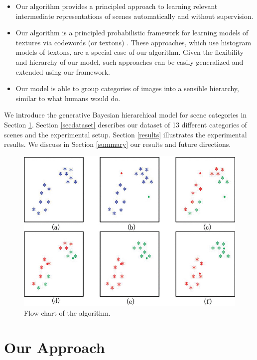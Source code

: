 \documentclass[10pt,a4paper,twocolumn]{article}
\begin{document}
\begin{itemize}
\item Our algorithm provides a principled approach to learning relevant intermediate representations of scenes automatically and without supervision.

\item  Our algorithm is a principled probabilistic framework for learning models of textures via codewords (or textons) \cite{malik, portilla, varma}. These approaches, which use histogram models of textons, are a special case of our algorithm. Given the flexibility and hierarchy of our model, such approaches can be easily generalized and extended using our framework.

\item  Our model is able to group categories of images into a sensible hierarchy, similar to what humans would do.
\end{itemize}

We introduce the generative Bayesian hierarchical model for scene categories in Section \ref{approach}. Section \ref{secdataset} describes our dataset of 13 different categories of scenes and the experimental setup. Section \ref{results} illustrates the experimental results. We discuss in Section \ref{summary} our results and future directions.\\

\begin{figure}
\includegraphics[scale=.2]{figure_2.jpg}
\caption{ Flow chart of the algorithm.}
\label{fig:algo}
\end{figure}

\section{Our Approach} \label{approach}
\end{document}
